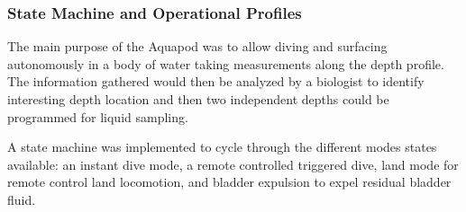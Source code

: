 
\subsubsection{State Machine and Operational Profiles}
The main purpose of the Aquapod was to allow diving and surfacing autonomously in a body of water taking measurements along the depth profile. The information gathered would then be analyzed by a biologist to identify interesting depth location and then two independent depths could be programmed for liquid sampling. 

A state machine was implemented to cycle through the different modes states available: an instant dive mode, a remote controlled triggered dive, land mode for remote control land locomotion, and bladder expulsion to expel residual bladder fluid. 



